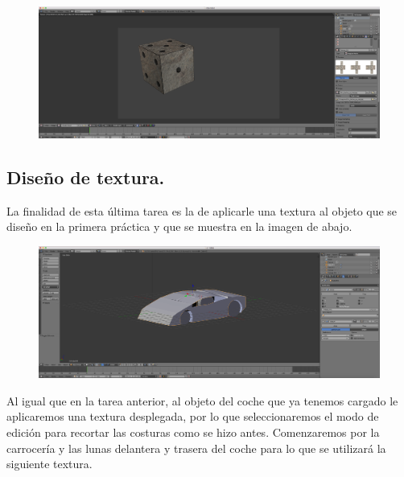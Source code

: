 \documentclass[10pt]{article}
\begin{document}
\begin{figure}[H]
	\begin{center}
	 		\includegraphics[width = 1.00\textwidth]{Imagenes/p3-img12}
	\end{center} 
\end{figure}


\subsection{Diseño de textura.} 

La finalidad de esta última tarea es la de aplicarle una textura al objeto que se diseño en la primera práctica y que se muestra en la imagen de abajo. \\  

\begin{figure}[H]
	\begin{center}
	 		\includegraphics[width = 1.00\textwidth]{Imagenes/p3-img13}
	\end{center} 
\end{figure}

Al igual que en la tarea anterior, al objeto del coche que ya tenemos cargado le aplicaremos una textura desplegada, por lo que seleccionaremos el modo de edición para recortar las costuras como se hizo antes. Comenzaremos por la carrocería y las lunas delantera y trasera del coche para lo que se utilizará la siguiente textura. \\
\end{document}
